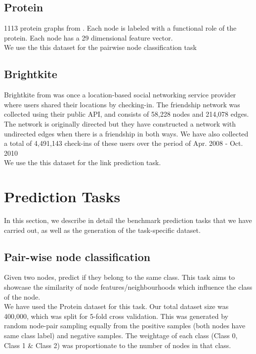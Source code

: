 \documentclass[sigconf]{acmart}
\begin{document}
\subsection{Protein}

1113 protein graphs from \citet{10.1093/bioinformatics/bti1007}. Each node is labeled with a functional role of the protein. Each node has a 29 dimensional feature vector. \\
We use the this dataset for the pairwise node classification task

\subsection{Brightkite}

Brightkite from \citet{cho2011friendship} was once a location-based social networking service provider where users shared their locations by checking-in. The friendship network was collected using their public API, and consists of 58,228 nodes and 214,078 edges. The network is originally directed but they have constructed a network with undirected edges when there is a friendship in both ways. We have also collected a total of 4,491,143 check-ins of these users over the period of Apr. 2008 - Oct. 2010 \\
We use the this dataset for the link prediction task.

\section{Prediction Tasks}
In this section, we describe in detail the benchmark prediction tasks that we have carried out, as well as the generation of the task-specific dataset.


\subsection{Pair-wise node classification}
Given two nodes, predict if they belong to the same class. This task aims to showcase the similarity of node features/neighbourhoods which influence the class of the node.\\

We have used the Protein \cite{10.1093/bioinformatics/bti1007} dataset for this task. Our total dataset size was 400,000, which was split for 5-fold cross validation. This was generated by random node-pair sampling equally from the positive samples (both nodes have same class label) and negative samples. The weightage of each class (Class 0, Class 1 \& Class 2) was proportionate to the number of nodes in that class.
\end{document}
